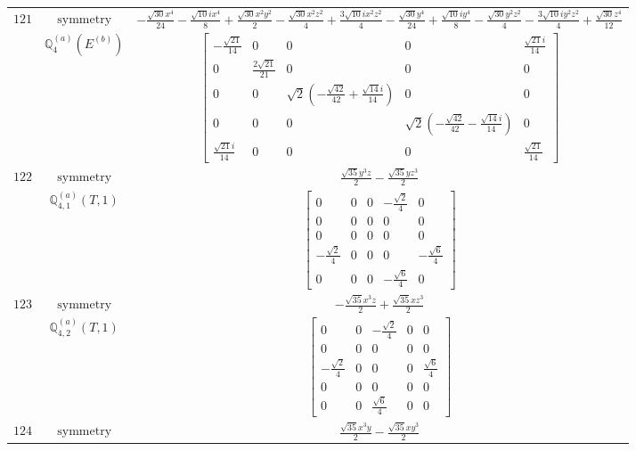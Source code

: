 \documentclass[fleqn,8pt,landscape]{jsarticle}
\begin{document}
\begin{longtable}{ccc}
$ 121 $ & $ \text{symmetry} $ & $ - \frac{\sqrt{30} x^{4}}{24} - \frac{\sqrt{10} i x^{4}}{8} + \frac{\sqrt{30} x^{2} y^{2}}{2} - \frac{\sqrt{30} x^{2} z^{2}}{4} + \frac{3 \sqrt{10} i x^{2} z^{2}}{4} - \frac{\sqrt{30} y^{4}}{24} + \frac{\sqrt{10} i y^{4}}{8} - \frac{\sqrt{30} y^{2} z^{2}}{4} - \frac{3 \sqrt{10} i y^{2} z^{2}}{4} + \frac{\sqrt{30} z^{4}}{12} $ \\
$  $ & $ \mathbb{Q}_{4}^{(a)}(E^{(b)}) $ & $ \begin{bmatrix} - \frac{\sqrt{21}}{14} & 0 & 0 & 0 & \frac{\sqrt{21} i}{14} \\ 0 & \frac{2 \sqrt{21}}{21} & 0 & 0 & 0 \\ 0 & 0 & \sqrt{2} \left(- \frac{\sqrt{42}}{42} + \frac{\sqrt{14} i}{14}\right) & 0 & 0 \\ 0 & 0 & 0 & \sqrt{2} \left(- \frac{\sqrt{42}}{42} - \frac{\sqrt{14} i}{14}\right) & 0 \\ \frac{\sqrt{21} i}{14} & 0 & 0 & 0 & \frac{\sqrt{21}}{14} \end{bmatrix} $ \\ \hline
$ 122 $ & $ \text{symmetry} $ & $ \frac{\sqrt{35} y^{3} z}{2} - \frac{\sqrt{35} y z^{3}}{2} $ \\
$  $ & $ \mathbb{Q}_{4,1}^{(a)}(T,1) $ & $ \begin{bmatrix} 0 & 0 & 0 & - \frac{\sqrt{2}}{4} & 0 \\ 0 & 0 & 0 & 0 & 0 \\ 0 & 0 & 0 & 0 & 0 \\ - \frac{\sqrt{2}}{4} & 0 & 0 & 0 & - \frac{\sqrt{6}}{4} \\ 0 & 0 & 0 & - \frac{\sqrt{6}}{4} & 0 \end{bmatrix} $ \\ \hline
$ 123 $ & $ \text{symmetry} $ & $ - \frac{\sqrt{35} x^{3} z}{2} + \frac{\sqrt{35} x z^{3}}{2} $ \\
$  $ & $ \mathbb{Q}_{4,2}^{(a)}(T,1) $ & $ \begin{bmatrix} 0 & 0 & - \frac{\sqrt{2}}{4} & 0 & 0 \\ 0 & 0 & 0 & 0 & 0 \\ - \frac{\sqrt{2}}{4} & 0 & 0 & 0 & \frac{\sqrt{6}}{4} \\ 0 & 0 & 0 & 0 & 0 \\ 0 & 0 & \frac{\sqrt{6}}{4} & 0 & 0 \end{bmatrix} $ \\ \hline
$ 124 $ & $ \text{symmetry} $ & $ \frac{\sqrt{35} x^{3} y}{2} - \frac{\sqrt{35} x y^{3}}{2} $ \\

\end{longtable}
\end{document}
